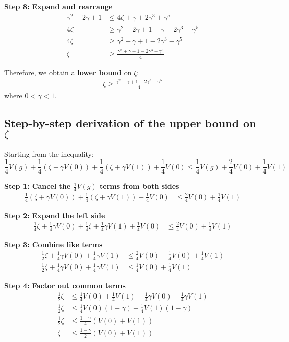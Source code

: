 \textbf{Step 8: Expand and rearrange}
\begin{align}
\gamma^2 + 2\gamma + 1 &\leq 4\zeta + \gamma + 2\gamma^3 + \gamma^5\\
4\zeta &\geq \gamma^2 + 2\gamma + 1 - \gamma - 2\gamma^3 - \gamma^5\\
4\zeta &\geq \gamma^2 + \gamma + 1 - 2\gamma^3 - \gamma^5\\
\zeta &\geq \frac{\gamma^2 + \gamma + 1 - 2\gamma^3 - \gamma^5}{4}
\end{align}

Therefore, we obtain a \textbf{lower bound} on $\zeta$:
\begin{align}
\zeta \geq \frac{\gamma^2 + \gamma + 1 - 2\gamma^3 - \gamma^5}{4}
\end{align}
where $0 < \gamma < 1$.

\subsection{Step-by-step derivation of the upper bound on $\zeta$}

Starting from the inequality:
$$\frac{1}{4}V(g) + \frac{1}{4}(\zeta + \gamma V(0)) + \frac{1}{4}(\zeta + \gamma V(1)) +\frac{1}{4} V(0) \leq \frac{1}{4}V(g) + \frac{2}{4}V(0) + \frac{1}{4}V(1)$$

\textbf{Step 1: Cancel the $\frac{1}{4}V(g)$ terms from both sides}
\begin{align}
\frac{1}{4}(\zeta + \gamma V(0)) + \frac{1}{4}(\zeta + \gamma V(1)) +\frac{1}{4} V(0) &\leq \frac{2}{4}V(0) + \frac{1}{4}V(1)
\end{align}

\textbf{Step 2: Expand the left side}
\begin{align}
\frac{1}{4}\zeta + \frac{1}{4}\gamma V(0) + \frac{1}{4}\zeta + \frac{1}{4}\gamma V(1) +\frac{1}{4} V(0) &\leq \frac{2}{4}V(0) + \frac{1}{4}V(1)
\end{align}

\textbf{Step 3: Combine like terms}
\begin{align}
\frac{1}{2}\zeta + \frac{1}{4}\gamma V(0) + \frac{1}{4}\gamma V(1) &\leq \frac{2}{4}V(0) - \frac{1}{4} V(0) + \frac{1}{4}V(1)\\
\frac{1}{2}\zeta + \frac{1}{4}\gamma V(0) + \frac{1}{4}\gamma V(1) &\leq \frac{1}{4}V(0) + \frac{1}{4}V(1)
\end{align}

\textbf{Step 4: Factor out common terms}
\begin{align}
\frac{1}{2}\zeta &\leq \frac{1}{4}V(0) + \frac{1}{4}V(1) - \frac{1}{4}\gamma V(0) - \frac{1}{4}\gamma V(1)\\
\frac{1}{2}\zeta &\leq \frac{1}{4}V(0)(1-\gamma) + \frac{1}{4}V(1)(1-\gamma)\\
\frac{1}{2}\zeta &\leq \frac{1-\gamma}{4}(V(0) + V(1))\\
\zeta &\leq \frac{1-\gamma}{2}(V(0) + V(1))
\end{align}

